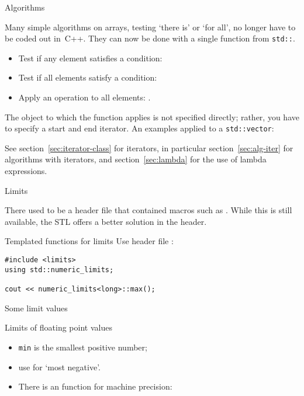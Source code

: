  {Algorithms}
\label{sec:algorithm}

Many simple algorithms on arrays, testing `there is' or `for all', no
longer have to be coded out in~C++. They can now be done with a single
function from \lstinline{std::}.
\begin{itemize}
\item Test if any element satisfies a condition:
\item Test if all elements satisfy a condition:
\item Apply an operation to all elements: .
\end{itemize}

The object to which the function applies is not specified directly; 
rather, you have to specify a start
and end iterator. An examples applied to a 
\lstinline{std::vector}:
%

See section~\ref{sec:iterator-class} for iterators,
in particular section~\ref{sec:alg-iter} for algorithms with iterators,
and
section~\ref{sec:lambda} for the use of lambda expressions.

 {Limits}
\label{sec:limits}

There used to be a header file  that contained
macros such as . While this is still available,
the \ac{STL} offers a better solution in the
 header.

\begin{block}{Templated functions for limits}
  \label{sl:stl-limits}
  Use header file :
\begin{lstlisting}
#include <limits>
using std::numeric_limits;

cout << numeric_limits<long>::max();
\end{lstlisting}
\end{block}

\begin{block}{Some limit values}
  \label{sl:ieee-limits}
\end{block}

\begin{block}{Limits of floating point values}
  \label{sl:float-limits}
  \begin{itemize}
  \item \lstinline{min} is the smallest positive number;
  \item use  for `most negative'.
  \item There is an  function for machine precision:
  \end{itemize}
\end{block}

